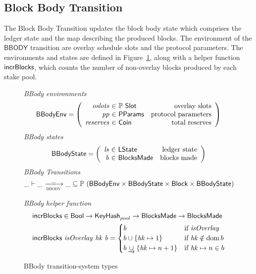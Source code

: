 \clearpage

\subsection{Block Body Transition}
\label{sec:block-body-trans}

The Block Body Transition updates the block body state which comprises the ledger state and the
map describing the produced blocks.
The environment of the $\mathsf{BBODY}$ transition are overlay schedule slots and the protocol
parameters.
The environments and states are defined in Figure~\ref{fig:ts-types:bbody}, along with
a helper function $\mathsf{incrBlocks}$, which counts the number of non-overlay blocks
produced by each stake pool.

\begin{figure}
  \emph{BBody environments}
  \begin{equation*}
    \BBodyEnv =
    \left(
      \begin{array}{r@{~\in~}lr}
        \var{oslots} & \powerset{\Slot} & \text{overlay slots} \\
        \var{pp} & \PParams & \text{protocol parameters} \\
        \var{reserves} & \Coin & \text{total reserves}
      \end{array}
    \right)
  \end{equation*}
  \emph{BBody states}
  \begin{equation*}
    \BBodyState =
    \left(
      \begin{array}{r@{~\in~}lr}
        \var{ls} & \LState & \text{ledger state} \\
        \var{b} & \BlocksMade & \text{blocks made} \\
      \end{array}
    \right)
  \end{equation*}
  \emph{BBody Transitions}
  \begin{equation*}
    \_ \vdash \var{\_} \trans{bbody}{\_} \var{\_} \subseteq
    \powerset (\BBodyEnv \times \BBodyState \times \Block \times \BBodyState)
  \end{equation*}
  \caption{BBody transition-system types}
  \label{fig:ts-types:bbody}
  \emph{BBody helper function}
  \begin{align*}
      & \mathsf{incrBlocks} \in \mathsf{Bool} \to \mathsf{KeyHash}_{pool} \to
          \mathsf{BlocksMade} \to \mathsf{BlocksMade} \\
      & \mathsf{incrBlocks}~\mathit{isOverlay}~\mathit{hk}~\mathit{b} =
        \begin{cases}
          b & \text{if }\mathit{isOverlay} \\
          b\cup\{\mathit{hk}\mapsto 1\} & \text{if }\mathit{hk}\notin\operatorname{dom}{b} \\
          b\mathbin{\underrightarrow\cup}\{\mathit{hk}\mapsto n+1\} & \text{if }\mathit{hk}\mapsto n\in b \\
        \end{cases}
  \end{align*}

\end{figure}

